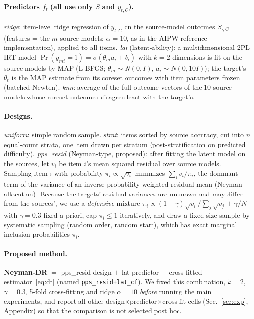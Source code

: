 \paragraph{Predictors $f_t$ (all use only $S$ and $y_{t,C}$).}
\emph{ridge}: item-level ridge regression of $y_{t,C}$ on the source-model outcomes $S_{\cdot,C}$ (features = the $m$ source models; $\alpha=10$, as in the AIPW reference implementation), applied to all items.
\emph{lat} (latent-ability): a multidimensional 2PL IRT model $\Pr(y_{mi}=1)=\sigma(\theta_m^\top a_i+b_i)$ with $k=2$ dimensions is fit on the source models by MAP (L-BFGS; $\theta_m\sim N(0,I)$, $a_i\sim N(0,10 I)$);  the target's $\theta_t$ is the MAP estimate from its coreset outcomes with item parameters frozen (batched Newton).
\emph{knn}: average of the full outcome vectors of the $10$ source models whose coreset outcomes disagree least with the target's.

\paragraph{Designs.}
\emph{uniform}: simple random sample.  \emph{strat}: items sorted by source accuracy, cut into $n$ equal-count strata, one item drawn per stratum (post-stratification on predicted difficulty).
\emph{pps\_resid} (Neyman-type, proposed): after fitting the latent model on the sources, let $v_i$ be item $i$'s mean squared residual over source models.
Sampling item $i$ with probability $\pi_i\propto \sqrt{v_i}$ minimizes $\sum_i v_i/\pi_i$, the dominant term of the variance of an inverse-probability-weighted residual mean (Neyman allocation).
Because the targets' residual variances are unknown and may differ from the sources', we use a \emph{defensive} mixture $\pi_i\propto(1-\gamma)\sqrt{v_i}/\sum_j\sqrt{v_j}+\gamma/N$ with $\gamma=0.3$ fixed a priori, cap $\pi_i\le1$ iteratively, and draw a fixed-size sample by systematic sampling (random order, random start), which has exact marginal inclusion probabilities $\pi_i$.

\paragraph{Proposed method.}
\textbf{Neyman-DR} $=$ pps\_resid design $+$ lat predictor $+$ cross-fitted estimator~\eqref{eq:dr} (named \texttt{pps\_resid+lat\_cf}).  We fixed this combination, $k=2$, $\gamma=0.3$, 5-fold cross-fitting and ridge $\alpha=10$ \emph{before} running the main experiments, and report all other design$\times$predictor$\times$cross-fit cells (Sec.~\ref{sec:exp}, Appendix) so that the comparison is not selected post hoc.

